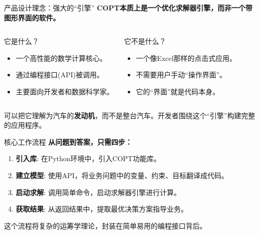 \documentclass[10pt]{beamer}
\begin{document}
\begin{frame}[allowframebreaks]{产品设计理念：强大的“引擎”}
  \textbf{COPT本质上是一个优化求解器引擎，而非一个带图形界面的软件。}

  \begin{columns}[T,onlytextwidth]
      \begin{alertblock}{它是什么？}
        \begin{itemize}
          \item 一个高性能的数学计算核心。
          \item 通过编程接口(API)被调用。
          \item 主要面向开发者和数据科学家。
        \end{itemize}
      \end{alertblock}
      \begin{block}{它不是什么？}
        \begin{itemize}
          \item 一个像Excel那样的点击式应用。
          \item 不需要用户手动“操作界面”。
          \item 它的“界面”就是代码本身。
        \end{itemize}
      \end{block}
  \end{columns}

  \begin{center}
    \vspace{0.5cm}
    可以把它理解为汽车的\textbf{发动机}，而不是整台汽车。开发者围绕这个“引擎”构建完整的应用程序。
  \end{center}
\end{frame}

\begin{frame}{核心工作流程}
  \textbf{从问题到答案，只需四步：}
  \begin{enumerate}[<+-| alert@+>]
    \item \textbf{引入库}: 在Python环境中，引入COPT功能库。
    \item \textbf{建立模型}: 使用API，将业务问题中的变量、约束、目标翻译成代码。
    \item \textbf{启动求解}: 调用简单命令，启动求解器引擎进行计算。
    \item \textbf{获取结果}: 从返回结果中，提取最优决策方案指导业务。
  \end{enumerate}
  \vspace{1cm}
  \begin{center}
  \large
  这个流程将复杂的运筹学理论，封装在简单易用的编程接口背后。
  \end{center}
\end{frame}
\end{document}

